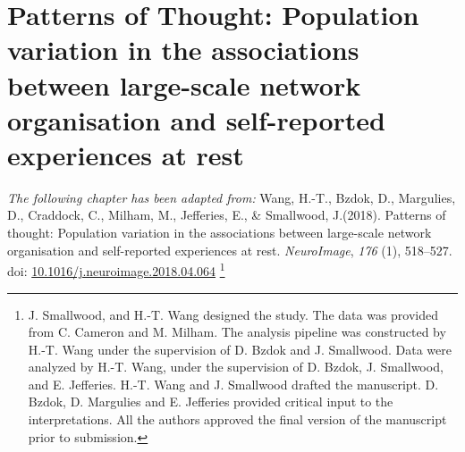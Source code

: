 \chapter{Patterns of Thought: Population variation in the associations between large-scale network organisation and self-reported experiences at rest}
\label{ch:study2}

\textit{The following chapter has been adapted from: }Wang, H.-T., Bzdok, D., Margulies, D., Craddock, C., Milham, M., Jefferies, E., \& Smallwood, J.(2018). Patterns of thought: Population variation in the associations between large-scale network organisation and self-reported experiences at rest.
\textit{NeuroImage}, \textit{176} (1), 518--527. doi: \url{10.1016/j.neuroimage.2018.04.064}
\footnote{
J. Smallwood, and H.-T. Wang designed the study. The data was provided from C. Cameron and M. Milham. The analysis pipeline was constructed by H.-T. Wang under the supervision of D. Bzdok and J. Smallwood. Data were analyzed by H.-T. Wang, under the supervision of D. Bzdok, J. Smallwood, and E. Jefferies. H.-T. Wang and J. Smallwood drafted the manuscript. D. Bzdok, D. Margulies and E. Jefferies provided critical input to the interpretations. All the authors approved the final version of the manuscript prior to submission.}

\newpage



